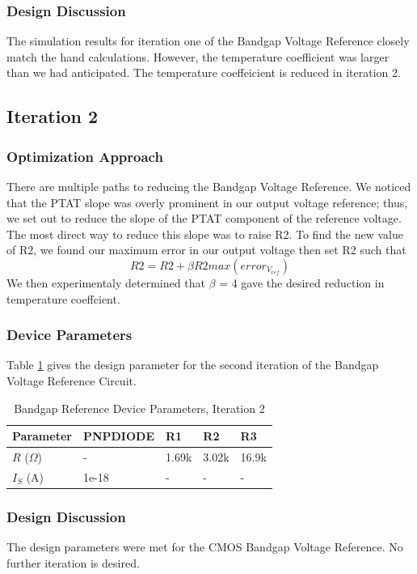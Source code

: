 \documentclass[conference]{IEEEtran}
\begin{document}
\subsubsection{Design Discussion}
The simulation results for iteration one of the Bandgap Voltage Reference closely match the hand calculations.  However, the temperature coefficient was larger than we had anticipated.  The temperature coeffeicient is reduced in iteration 2.

\subsection{Iteration 2}
\subsubsection{Optimization Approach}
There are multiple paths to reducing the Bandgap Voltage Reference.  We noticed that the PTAT slope was overly prominent in our output voltage reference; thus, we set out to reduce the slope of the PTAT component of the reference voltage.  The most direct way to reduce this slope was to raise R2.  To find the new value of R2, we found our maximum error in our output voltage then set R2 such that
	\begin{equation}
		R2 = R2 + \beta R2 max(error_{V_{ref}})
	\end{equation}
We then experimentaly determined that $\beta$ = 4 gave the desired reduction in temperature coeffcient.
\subsubsection{Device Parameters}
Table \ref{tab:bg-dp-2} gives the design parameter for the second iteration of the Bandgap Voltage Reference Circuit.
\begin{table}[!htbp]
  \caption[]{Bandgap Reference Device Parameters, Iteration 2}
  \label{tab:bg-dp-2}
  \centering
  \begin{tabular}{|l|l|l|l|l|}
    \hline
    Parameter			& PNPDIODE	&R1 &R2	&R3 \\ \hline
    $R$ ($\Omega$)		&-		&1.69k	&3.02k	&16.9k\\ \hline
    $I_S$ (A)		&1e-18		&-	&-	&-\\
    \hline
  \end{tabular}
\end{table}
\subsubsection{Design Discussion}
The design parameters were met for the CMOS Bandgap Voltage Reference.  No further iteration is desired.
\end{document}
